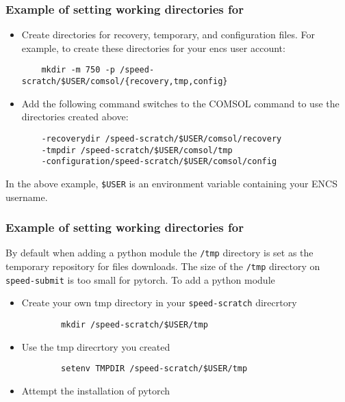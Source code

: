 \documentclass{easychair}
\begin{document}
\subsubsection{Example of setting working directories for }

\begin{itemize}
	\item 
	Create directories for recovery, temporary, and configuration files. 
	For example, to create these directories for your encs user account:
	\begin{verbatim}
	mkdir -m 750 -p /speed-scratch/$USER/comsol/{recovery,tmp,config}
	\end{verbatim}
	\item
	Add the following command switches to the COMSOL command to use the 
	directories created above:
	\begin{verbatim} 
	-recoverydir /speed-scratch/$USER/comsol/recovery 
	-tmpdir /speed-scratch/$USER/comsol/tmp
	-configuration/speed-scratch/$USER/comsol/config
	\end{verbatim}
\end{itemize} 
In the above example, \verb!$USER! is an environment variable containing your ENCS username.

\subsubsection{Example of setting working directories for }

By default when adding a python module the \texttt{/tmp} directory is set as the temporary repository for files downloads. 
The size of the \texttt{/tmp} directory on \verb!speed-submit! is too small for pytorch.
To add a python module
\begin{itemize}
    \item 	
	Create your own tmp directory in your \verb!speed-scratch! direcrtory
	\begin{verbatim} 
        mkdir /speed-scratch/$USER/tmp
	\end{verbatim}
	\item
    Use the tmp direcrtory you created
	\begin{verbatim} 
        setenv TMPDIR /speed-scratch/$USER/tmp
	\end{verbatim}
    \item
	Attempt the installation of pytorch
\end{itemize}
\end{document}
